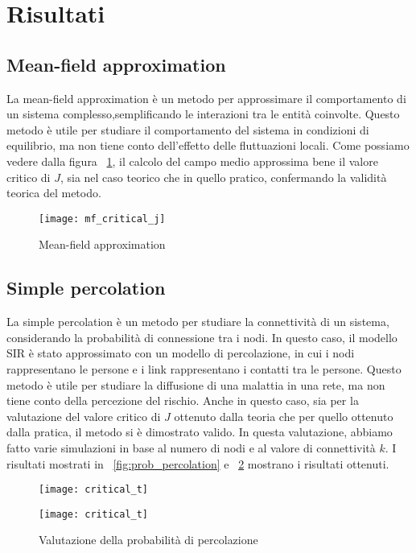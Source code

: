 \section{Risultati}\label{sec:risultati}

\subsection{Mean-field approximation}\label{subsec:res-mean-field-approximation}
    La mean-field approximation è un metodo per approssimare il comportamento 
    di un sistema complesso,semplificando le interazioni tra le entità coinvolte.
    Questo metodo è utile per studiare il comportamento del sistema in condizioni di equilibrio, ma non tiene conto
    dell'effetto delle fluttuazioni locali.
    Come possiamo vedere dalla figura ~\ref{fig:mf_critical_j}, il calcolo del campo medio approssima bene il valore
    critico di $J$, sia nel caso teorico che in quello pratico, confermando la validità teorica del metodo.

    \begin{figure}[h]
        \texttt{[image: mf\_critical\_j]}\caption{Mean-field approximation}
        \label{fig:mf_critical_j}
    \end{figure}

\subsection{Simple percolation}\label{subsec:res-simple-percolation}
    La simple percolation è un metodo per studiare la connettività di un sistema, considerando la probabilità di
    connessione tra i nodi.
    In questo caso, il modello SIR è stato approssimato con un modello di percolazione, in cui i nodi rappresentano le
    persone e i link rappresentano i contatti tra le persone.
    Questo metodo è utile per studiare la diffusione di una malattia in una rete, ma non tiene conto della percezione
    del rischio.
    Anche in questo caso, sia per la valutazione del valore critico di $J$ ottenuto dalla teoria che per quello
    ottenuto dalla pratica, il metodo si è dimostrato valido.
    In questa valutazione, abbiamo fatto varie simulazioni in base al numero di nodi e al valore di connettività $k$.
    I risultati mostrati in ~\ref{fig:prob_percolation} e ~\ref{fig:prob_percolation_2} mostrano i risultati ottenuti.

    \begin{figure}[h]
        \begin{minipage}{0.5\textwidth}
            \texttt{[image: critical\_t]}\label{fig:prob_percolation}
        \end{minipage}
        \begin{minipage}{0.5\textwidth}
            \texttt{[image: critical\_t]}\label{fig:prob_percolation_2}
        \end{minipage}
        \caption{Valutazione della probabilità di percolazione}
    \end{figure}

